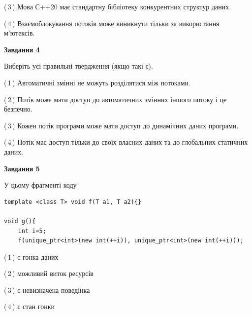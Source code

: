 \documentclass[12pt, ukrainian]{article}
\begin{document}
\begin {large}
{(\,3\,) Мова С++20 має стандартну бібліотеку конкурентних структур даних.%

(\,4\,) Взаємоблокування потоків може виникнути тільки за використання м’ютексів.%



\begin{center}
\textbf{Завдання 4}
\end{center}
Виберіть усі правильні твердження (якщо такі є).\par
\vspace{2mm}

(\,1\,) Автоматичні змінні не можуть розділятися між потоками.%

(\,2\,) Потік може мати доступ до автоматичних змінних іншого потоку і це безпечно.%

(\,3\,) Кожен потік програми може мати доступ до динамічних даних програми.%

(\,4\,) Потік має доступ тільки до своїх власних даних та до глобальних статичних даних.%



\begin{center}
\textbf{Завдання 5}
\end{center}
У цьому фрагменті коду
\begin{verbatim}
template <class T> void f(T a1, T a2){}

void g(){
    int i=5;
    f(unique_ptr<int>(new int(++i)), unique_ptr<int>(new int(++i)));
\end{verbatim}

(\,1\,) є гонка даних%

(\,2\,) можливий виток ресурсів%

(\,3\,) є невизначена поведінка%

(\,4\,) є стан гонки%


}
\end {large}
\end{document}
